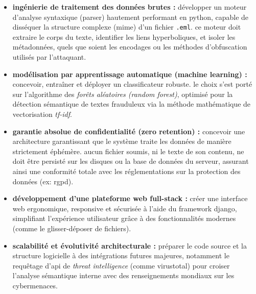\documentclass[12pt,a4paper]{report}
\begin{document}
\begin{itemize}
    \item \textbf{ingénierie de traitement des données brutes :} développer un moteur d'analyse syntaxique (parser) hautement performant en python, capable de disséquer la structure complexe (mime) d'un fichier \texttt{.eml}. ce moteur doit extraire le corps du texte, identifier les liens hyperboliques, et isoler les métadonnées, quels que soient les encodages ou les méthodes d'obfuscation utilisés par l'attaquant.
    \item \textbf{modélisation par apprentissage automatique (machine learning) :} concevoir, entraîner et déployer un classificateur robuste. le choix s'est porté sur l'algorithme des \textit{forêts aléatoires (random forest)}, optimisé pour la détection sémantique de textes frauduleux via la méthode mathématique de vectorisation \textit{tf-idf}.
    \item \textbf{garantie absolue de confidentialité (zero retention) :} concevoir une architecture garantissant que le système traite les données de manière strictement éphémère. aucun fichier soumis, ni le texte de son contenu, ne doit être persisté sur les disques ou la base de données du serveur, assurant ainsi une conformité totale avec les réglementations sur la protection des données (ex: rgpd).
    \item \textbf{développement d'une plateforme web full-stack :} créer une interface web ergonomique, responsive et sécurisée à l'aide du framework django, simplifiant l'expérience utilisateur grâce à des fonctionnalités modernes (comme le glisser-déposer de fichiers).
    \item \textbf{scalabilité et évolutivité architecturale :} préparer le code source et la structure logicielle à des intégrations futures majeures, notamment le requêtage d'api de \textit{threat intelligence} (comme virustotal) pour croiser l'analyse sémantique interne avec des renseignements mondiaux sur les cybermenaces.
\end{itemize}
\end{document}
